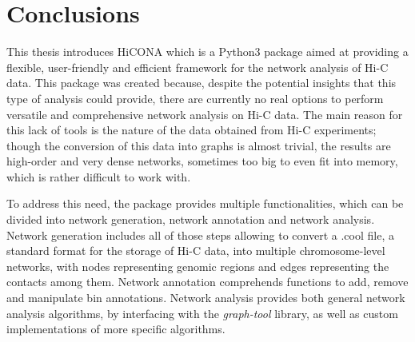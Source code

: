 \graphicspath{{chapters/07_conclusions/}}
\chapter{Conclusions}


This thesis introduces HiCONA which is a Python3 package aimed at providing a flexible, user-friendly and efficient framework for the network analysis of Hi-C data. This package was created because, despite the potential insights that this type of analysis could provide, there are currently no real options to perform versatile and comprehensive network analysis on Hi-C data. The main reason for this lack of tools is the nature of the data obtained from Hi-C experiments; though the conversion of this data into graphs is almost trivial, the results are high-order and very dense networks, sometimes too big to even fit into memory, which is rather difficult to work with.

To address this need, the package provides multiple functionalities, which can be divided into network generation, network annotation and network analysis. Network generation includes all of those steps allowing to convert a .cool file, a standard format for the storage of Hi-C data, into multiple chromosome-level networks, with nodes representing genomic regions and edges representing the contacts among them. Network annotation comprehends functions to add, remove and manipulate bin annotations. Network analysis provides both general network analysis algorithms, by interfacing with the \textit{graph-tool} library, as well as custom implementations of more specific algorithms. 

